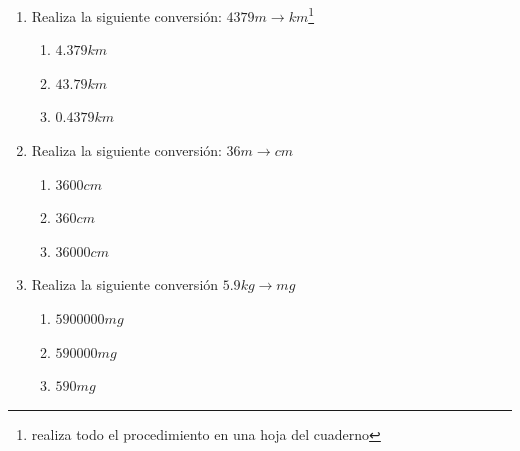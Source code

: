\documentclass[12pt]{article}
\begin{document}
\begin{enumerate}
    \item Realiza la siguiente conversión: $4379 m \rightarrow km$\footnote{realiza todo el procedimiento en una hoja del cuaderno } 
   
      \begin{enumerate}
      \item$ 4.379km$
      \item $ 43.79 km$ 
      \item  $0.4379 km$
  \end{enumerate}
     
     
    
       
     
     \item Realiza la siguiente conversión: $36 m \rightarrow cm $ 
      \begin{multicols}{2}
  \begin{enumerate}
      \item$ 3600 cm$
      \item $ 360 cm$ 
      \item  $36 000 cm$
  \end{enumerate}
  \end{multicols}
  
  
    
 
  \item Realiza la siguiente conversión $5.9 kg\rightarrow mg $
  \begin{multicols}{2}
  \begin{enumerate}
      \item$ 5 900 000 mg$
      \item $ 590 000 mg$ 
      \item  $590 mg$
  \end{enumerate}
     \end{multicols}
    
    
    
\end{enumerate}
\end{document}
